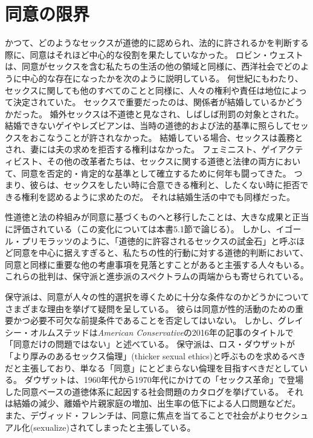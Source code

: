 \documentclass[paper=a4,book,openany]{jlreq}
\newcommand{\ig}[1]{}           %
\begin{document}
\section{同意の限界}

かつて、どのようなセックスが道徳的に認められ、法的に許されるかを判断する際に、同意はそれほど中心的な役割を果たしていなかった。
ロビン・ウェスト\ig{Robin West}は、同意がセックスを含む私たちの生活の他の領域と同様に、西洋社会でどのように中心的な存在になったかを次のように説明している。
何世紀にもわたり、セックスに関しても他のすべてのことと同様に、人々の権利や責任は地位によって決定されていた。
セックスで重要だったのは、関係者が結婚しているかどうかだった。
婚外セックスは不道徳と見なされ、しばしば刑罰の対象とされた。
結婚できないゲイやレズビアンは、当時の道徳的および法的基準に照らしてセックスをおこなうことが許されなかった。
結婚している場合、セックスは義務とされ、妻には夫の求めを拒否する権利はなかった。
フェミニスト、ゲイアクティビスト、その他の改革者たちは、セックスに関する道徳と法律の両方において、同意を否定的・肯定的な基準として確立するために何年も闘ってきた。
つまり、彼らは、セックスをしたい時に合意できる権利と、したくない時に拒否できる権利を認めるように求めたのだ。
それは結婚生活の中でも同様だった\citep[p.7]{west20:_consen_legit_dysph}。

性道徳と法の枠組みが同意に基づくものへと移行したことは、大きな成果と正当に評価されている（この変化については本書5.1節で論じる）。
しかし、イゴール・プリモラッツのように、「道徳的に許容されるセックスの試金石」と呼ぶほど同意を中心に据えすぎると、私たちの性的行動に対する道徳的判断において、同意と同様に重要な他の考慮事項を見落とすことがあると主張する人々もいる\citep{primoratz01:_sexual_moral}。
これらの批判は、保守派と進歩派のスペクトラムの両端からも寄せられている。

保守派は、同意が人々の性的選択を導くために十分な条件なのかどうかについてさまざまな理由を挙げて疑問を呈している。
彼らは同意が性的活動のための重要かつ必要不可欠な前提条件であることを否定してはいない。
しかし、グレイシー・オルムステッドは\emph{American Conservative}の2016年の記事のタイトルで「同意だけの問題ではない」と述べている\citep{olmstead16:_its_not_just_consen}。
保守派は、ロス・ダウザットが「より厚みのあるセックス倫理」(thicker sexual ethics)と呼ぶものを求めるべきだと主張しており、単なる「同意」にとどまらない倫理を目指すべきだとしている\citep{douthat17:_age_consen_its_discon}。
ダウザットは、1960年代から1970年代にかけての「セックス革命」で登場した同意ベースの道徳体系に起因する社会問題のカタログを挙げている。
それは結婚の減少、離婚や片親家庭の増加、出生率の低下による人口問題などだ。
また、デヴィッド・フレンチ\ig{David French}は、同意に焦点を当てることで社会がよりセクシュアル化(sexualize)されてしまったと主張している。
\end{document}
